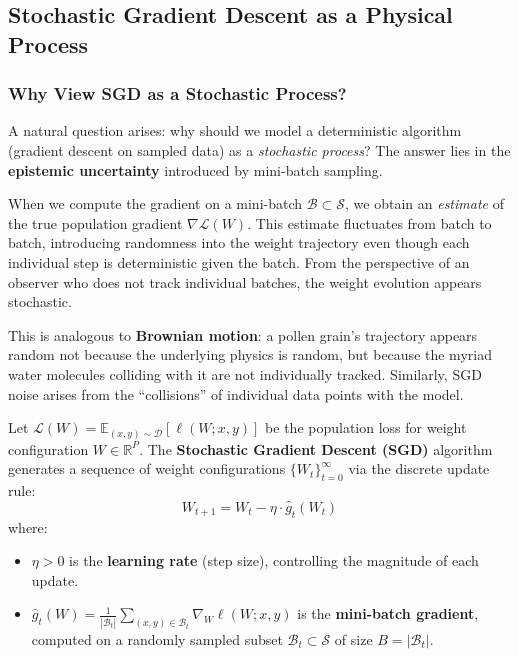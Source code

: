 \documentclass[
  journal=largetwo,
  year=2025,
  volume=37,
]{cup-journal}
\begin{document}
\subsection{Stochastic Gradient Descent as a Physical Process}

\subsubsection{Why View SGD as a Stochastic Process?}

A natural question arises: why should we model a deterministic algorithm (gradient descent on sampled data) as a \textit{stochastic process}? The answer lies in the \textbf{epistemic uncertainty} introduced by mini-batch sampling.

When we compute the gradient on a mini-batch $\mathcal{B} \subset \mathcal{S}$, we obtain an \textit{estimate} of the true population gradient $\nabla \mathcal{L}(W)$. This estimate fluctuates from batch to batch, introducing randomness into the weight trajectory even though each individual step is deterministic given the batch. From the perspective of an observer who does not track individual batches, the weight evolution appears stochastic.

This is analogous to \textbf{Brownian motion}: a pollen grain's trajectory appears random not because the underlying physics is random, but because the myriad water molecules colliding with it are not individually tracked. Similarly, SGD noise arises from the ``collisions'' of individual data points with the model.

\begin{definition}\label{def:sgd_formal}
Let $\mathcal{L}(W) = \mathbb{E}_{(x,y)\sim\mathcal{D}}[\ell(W; x, y)]$ be the population loss for weight configuration $W \in \mathbb{R}^P$. The \textbf{Stochastic Gradient Descent (SGD)} algorithm generates a sequence of weight configurations $\{W_t\}_{t=0}^{\infty}$ via the discrete update rule:
\begin{equation}\label{eq:sgd_discrete}
    W_{t+1} = W_t - \eta \cdot \hat{g}_t(W_t)
\end{equation}
where:
\begin{itemize}
    \item $\eta > 0$ is the \textbf{learning rate} (step size), controlling the magnitude of each update.
    \item $\hat{g}_t(W) = \frac{1}{|\mathcal{B}_t|} \sum_{(x,y) \in \mathcal{B}_t} \nabla_W \ell(W; x, y)$ is the \textbf{mini-batch gradient}, computed on a randomly sampled subset $\mathcal{B}_t \subset \mathcal{S}$ of size $B = |\mathcal{B}_t|$.
\end{itemize}
\end{definition}
\end{document}
